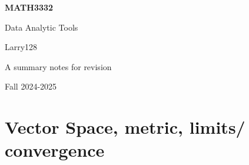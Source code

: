 \documentclass[11pt]{article}
\begin{document}
\begin{titlepage}
    \begin{center}
        \vspace*{1cm}
            
        \Huge
        \textbf{MATH3332}
            
        \vspace{0.5cm}
        \LARGE
        Data Analytic Tools
            
        \vspace{1.5cm}
            
        Larry128
            
        \vfill
            
        A summary notes for revision
            
        \vspace{0.8cm}
                
        \Large
        Fall 2024-2025
            
    \end{center}
\end{titlepage}
\tableofcontents
\newpage

\section{Vector Space, metric, limits/ convergence}
\end{document}
